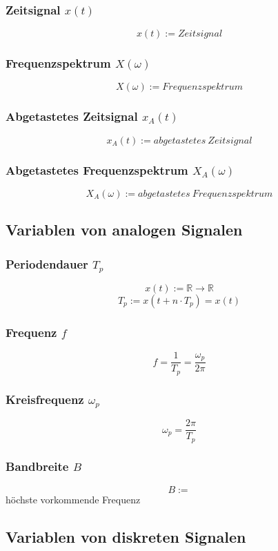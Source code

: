 \documentclass[12pt,a4paper]{scrartcl}
\begin{document}
\subsubsection{Zeitsignal $x(t)$}
\label{sec:sub:sub:zeitsignal}
$$x(t) := Zeitsignal$$
\subsubsection{Frequenzspektrum $X(\omega)$}
\label{sec:sub:sub:frequenzspektrum}
$$X(\omega) := Frequenzspektrum $$
\subsubsection{Abgetastetes Zeitsignal $x_A(t)$}
\label{sec:sub:sub:abgetastetes-zeitsignal}
$$x_A(t) := abgetastetes\ Zeitsignal$$
\subsubsection{Abgetastetes Frequenzspektrum $X_A(\omega)$}
\label{sec:sub:sub:abgetastetes-frequenzspektrum}
$$X_A(\omega) := abgetastetes\ Frequenzspektrum $$

\subsection{Variablen von analogen Signalen}
\label{sec:sub:const-def-analoge-signale}
\subsubsection{Periodendauer $T_p$}
\label{sec:sub:sub:periodendauer}
$$ x(t) := \mathbb{R} \to \mathbb{R}$$
$$T_p := x(t + n \cdot T_p) = x(t)$$
\subsubsection{Frequenz $f$}
\label{sec:sub:sub:frequenz}
$$f = \frac{1}{T_p} = \frac{\omega_p}{2\pi}$$
\subsubsection{Kreisfrequenz $\omega_p$}
\label{sec:sub:sub:periodendauer-im-spektrum-kreisfrequenz}
$$\omega_p = \frac{2\pi}{T_p}$$
\subsubsection{Bandbreite $B$}
\label{sec:sub:sub:bandbreite}
$$B :=$$ höchste vorkommende Frequenz

\subsection{Variablen von diskreten Signalen}
\label{sec:sub:const-def-diskrete-signale}
\end{document}
